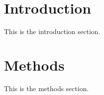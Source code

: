 \documentclass{article}
\begin{document}
\section{Introduction}
\label{sec:introduction}
\hypertarget{introduction}{}

This is the introduction section.

\section{Methods}
\label{sec:methods}
\hypertarget{methods}{}

This is the methods section.
\end{document}
